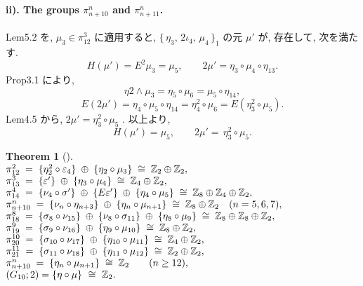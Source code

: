 \documentclass[10pt, leqno]{ltjsarticle}
\makeatletter
\newenvironment{Thleft}[1][]{%
  \begin{theorem}[#1]\mbox{}\\[0ex]\begingroup
  \setlength{\arraycolsep}{0pt}%
  \renewcommand{\arraystretch}{1.0}%
  \noindent$\begin{array}{@{}l@{}}%
}{%
  \end{array}$\par\endgroup\end{theorem}%
}
\newcommand{\toda}[1]{\{\,#1\,\}}              %
\newcommand{\gen}[1]{\{#1\}}       %
\newcommand{\pit}[2]{\pi_{#1}^{#2}}
\numberwithin{equation}{section}
\theoremstyle{plain}
\newtheorem{theorem}{Theorem}[section]
\theoremstyle{definition}
\theoremstyle{remark}
\makeatother
\begin{document}
\begin{paracol}{2}

\paragraph{ii). The groups \(\pit{n+10}{n}\) and \(\pit{n+11}{n}\).}

Lem5.2 を, \(\mu_{3}\in\pit{12}{3}\) に適用すると, 
\(\toda{\eta_{3},\,2\iota_{4},\,\mu_{4}}_{1}\) の元
\(\mu'\) が, 存在して, 次を満たす.
\[
H(\mu')=E^{2}\mu_{3}=\mu_{5},\qquad 2\mu' = \eta_3\circ\mu_4\circ\eta_{13}.
\]
Prop3.1 により, 
\[
\eta2\wedge\mu_3 = \eta_5\circ\mu_6 = \mu_5\circ\eta_{14},
\]
\[
E(2\mu') = \eta_4\circ\mu_5\circ\eta_{14} 
= \eta_4^2\circ\mu_6 = E(\eta_3^2\circ\mu_5) .
\]
Lem4.5 から, \(2\mu' = \eta_3^2\circ\mu_5\) .
以上より, 
\begin{equation}
H(\mu')=\mu_{5},\qquad 2\mu'=\,\eta_{3}^{2}\circ \mu_{5} .
\end{equation}

\begin{Thleft}[]
\pit{12}{2} \;=\; \gen{\eta_{2}^{2}\circ \varepsilon_{4}} \;\oplus\; \gen{\eta_{2}\circ \mu_{3}}
  \;\cong\; \mathbb Z_{2}\oplus\mathbb Z_{2},\\
\pit{13}{3} \;=\; \gen{\varepsilon'} \;\oplus\; \gen{\eta_{3}\circ \mu_{4}}
  \;\cong\; \mathbb Z_{4}\oplus\mathbb Z_{2},\\
\pit{14}{4} \;=\; \gen{\nu_{4}\circ \sigma'} \;\oplus\; \gen{E \varepsilon'} \;\oplus\; \gen{\eta_{4}\circ \mu_{5}}
  \;\cong\; \mathbb Z_{8}\oplus\mathbb Z_{4}\oplus\mathbb Z_{2},\\
\pit{n+10}{n} \;=\; \gen{\nu_{n}\circ \eta_{n+3}} \;\oplus\; \gen{\eta_{n}\circ \mu_{n+1}}
  \;\cong\; \mathbb Z_{8}\oplus\mathbb Z_{2}\quad (n=5,6,7),\\
\pit{18}{8} \;=\; \gen{\sigma_{8}\circ \nu_{15}} \;\oplus\; \gen{\nu_{8}\circ \sigma_{11}} \;\oplus\; \gen{\eta_{8}\circ \mu_{9}}
  \;\cong\; \mathbb Z_{8}\oplus\mathbb Z_{8}\oplus\mathbb Z_{2},\\
\pit{19}{9} \;=\; \gen{\sigma_{9}\circ \nu_{16}} \;\oplus\; \gen{\eta_{9}\circ \mu_{10}}
  \;\cong\; \mathbb Z_{8}\oplus\mathbb Z_{2},\\
\pit{20}{10} \;=\; \gen{\sigma_{10}\circ \nu_{17}} \;\oplus\; \gen{\eta_{10}\circ \mu_{11}}
  \;\cong\; \mathbb Z_{4}\oplus\mathbb Z_{2},\\
\pit{21}{11} \;=\; \gen{\sigma_{11}\circ \nu_{18}} \;\oplus\; \gen{\eta_{11}\circ \mu_{12}}
  \;\cong\; \mathbb Z_{2}\oplus\mathbb Z_{2},\\
\pit{n+10}{n} \;=\; \gen{\eta_{n}\circ \mu_{n+1}}
  \;\cong\; \mathbb Z_{2}\qquad (n\ge 12),\\
(G_{10};2)=\gen{\eta\circ \mu}\ \cong\ \mathbb Z_{2}.
\end{Thleft}


\end{paracol}
\end{document}
